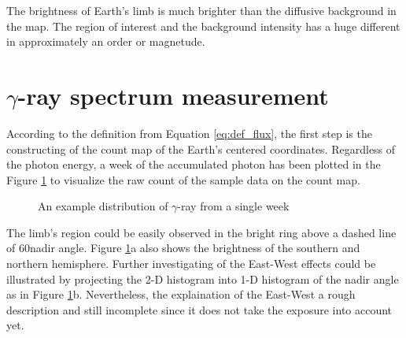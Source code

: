 The brightness of Earth's limb is much brighter than the 
diffusive background in the map. The region of interest and 
the background intensity has a huge different in approximately
an order or magnetude.


\section{$\gamma$-ray spectrum measurement}

According to the definition from Equation \ref{eq:def_flux}, 
the first step is the constructing of the count map of the Earth's 
centered coordinates. Regardless of the photon energy, a week of the 
accumulated photon has been plotted in the Figure \ref{fig:sample_photon_dist} to visualize 
the raw count of the sample data on the count map.

\begin{figure}[h!]
    \centering
        \hfill
        \caption{An example distribution of $\gamma$-ray from a single week}
       \label{fig:sample_photon_dist}
\end{figure}

The limb's region could be easily observed in the bright ring above 
a dashed line of 60\textdegree nadir angle. 
Figure \ref{fig:sample_photon_dist}a also shows the brightness of 
the southern and northern hemisphere. Further investigating of the 
East-West effects could be illustrated by projecting the 2-D histogram 
into 1-D histogram of the nadir angle as in Figure \ref{fig:sample_photon_dist}b.
Nevertheless, the explaination of the East-West a rough description
and still incomplete since it does not take the exposure into account yet.

